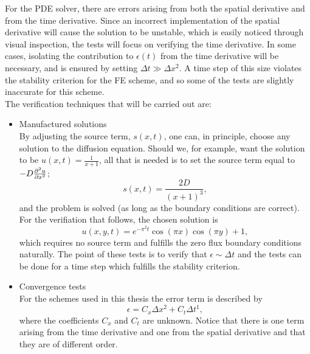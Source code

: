 \noindent For the PDE solver, there are errors arising from both the spatial derivative and from the time derivative. 
Since an incorrect implementation of the spatial derivative will cause the solution to be unstable, which is easily noticed through visual inspection, the tests will focus on verifying the time derivative. 
In some cases, isolating the contribution to $\epsilon(t)$ from the time derivative will be necessary, and is ensured by setting $\Delta t \gg\Delta x^2$. 
A time step of this size violates the stability criterion for the FE scheme, and so some of the tests are slightly inaccurate for this scheme. \\

The verification techniques that will be carried out are:

\begin{itemize}
 \item Manufactured solutions\\
 By adjusting the source term, $s(x,t)$, one can, in principle, choose any solution to the diffusion equation. 
Should we, for example, want the solution to be $u(x,t) = \frac{1}{x+1}$, all that is needed is to set the source term equal to $-D\frac{\partial^2 u}{\partial x^2}$;
\begin{equation*}
s(x,t) = \frac{2D}{(x+1)^3},
\end{equation*}
and the problem is solved (as long as the boundary conditions are correct).
 For the verifiation that follows, the chosen solution is
 \begin{equation}\label{manufactured_solution}
  u(x,y,t) = e^{-\pi^2t}\cos(\pi x)\cos(\pi y) +1,
 \end{equation}
 which requires no source term and fulfills the zero flux boundary conditions naturally. 
  The point of these tests is to verify that $\epsilon \sim \Delta t$ and the tests can be done for a time step which fulfills the stability criterion.
  \item Convergence tests \\
 For the schemes used in this thesis the error term is described by
\begin{equation}\label{analysis:error}
 \epsilon = C_x\Delta x^2 + C_t\Delta t^1,
\end{equation}
where the coefficients $C_x$ and $C_t$ are unknown. 
Notice that there is one term arising from the time derivative and one from the spatial derivative and that they are of different order. \\

\end{itemize}
